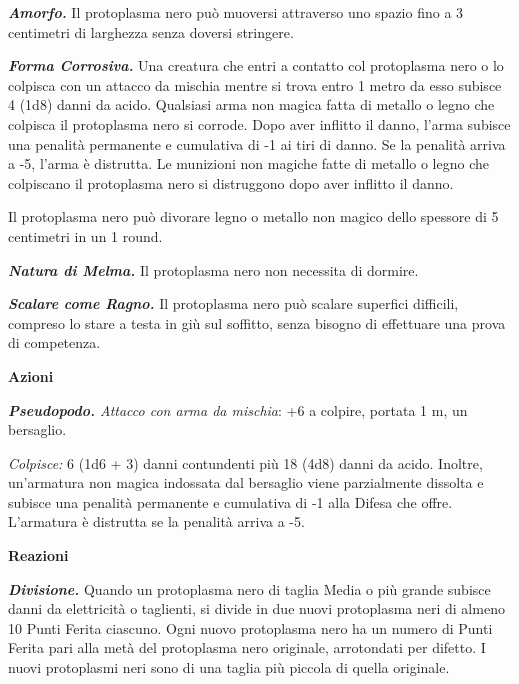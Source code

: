 \begin{multicols}{2}
{\emph{\textbf{Amorfo.}} Il protoplasma nero può muoversi attraverso uno spazio fino a 3 centimetri di larghezza senza doversi stringere.

\emph{\textbf{Forma Corrosiva.}} Una creatura che entri a contatto col protoplasma nero o lo colpisca con un attacco da mischia mentre si trova entro 1 metro da esso subisce 4 (1d8) danni da acido. Qualsiasi arma non magica fatta di metallo o legno che colpisca il protoplasma nero si corrode. Dopo aver inflitto il danno, l'arma subisce una penalità permanente e cumulativa di -1 ai tiri di danno. Se la penalità arriva a -5, l'arma è distrutta. Le munizioni non magiche fatte di metallo o legno che colpiscano il protoplasma nero si distruggono dopo aver inflitto il danno.

Il protoplasma nero può divorare legno o metallo non magico dello spessore di 5 centimetri in un 1 round.

\emph{\textbf{Natura di Melma.}} Il protoplasma nero non necessita di dormire.

\emph{\textbf{Scalare come Ragno.}} Il protoplasma nero può scalare superfici difficili, compreso lo stare a testa in giù sul soffitto, senza bisogno di effettuare una prova di competenza.

\textbf{Azioni}

\emph{\textbf{Pseudopodo.} Attacco con arma da mischia}: +6 a colpire, portata 1 m, un bersaglio.

\emph{Colpisce:} 6 (1d6 + 3) danni contundenti più 18 (4d8) danni da acido. Inoltre, un'armatura non magica indossata dal bersaglio viene parzialmente dissolta e subisce una penalità permanente e cumulativa di -1 alla Difesa che offre. L'armatura è distrutta se la penalità arriva a -5.

\textbf{Reazioni}

\emph{\textbf{Divisione.}} Quando un protoplasma nero di taglia Media o più grande subisce danni da elettricità o taglienti, si divide in due nuovi protoplasma neri di almeno 10 Punti Ferita ciascuno. Ogni nuovo protoplasma nero ha un numero di Punti Ferita pari alla metà del protoplasma nero originale, arrotondati per difetto. I nuovi protoplasmi neri sono di una taglia più piccola di quella originale.

}
\end{multicols}
